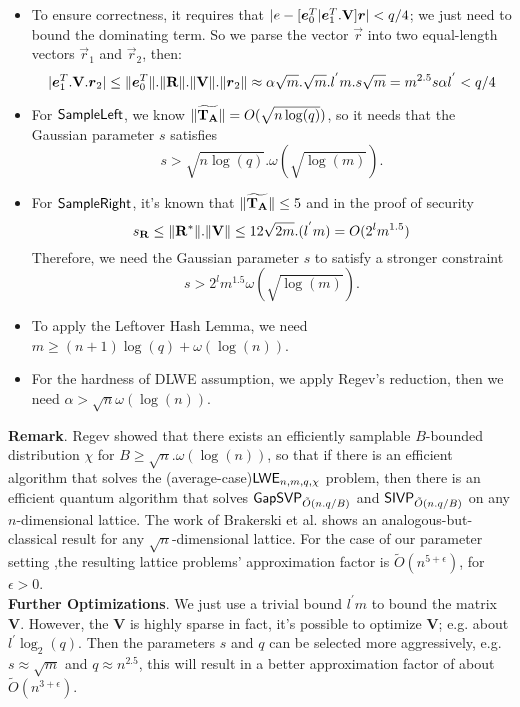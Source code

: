\begin{itemize}
 \item To ensure correctness, it requires that $|e-[\boldsymbol{e}^{T}_{0}|\boldsymbol{e}^{T}_{1}.\mathbf{V}]\boldsymbol{r}|< q/4$; we just need to bound the dominating term. So we parse the  vector $\vec{r}$ into two equal-length vectors $\vec{r}_{1}$ and $\vec{r}_{2}$, then:
 \begin{equation}
       |\boldsymbol{e}^{T}_{1}.\mathbf{V}.\boldsymbol{r}_{2}|\leq \| \boldsymbol{e}^{T}_{0}\|.\| \mathbf{R}\|.\| \mathbf{V}\|.\| \boldsymbol{r}_{2}\|\approx \alpha\sqrt{m}.\sqrt{m}.l^{'}m.s\sqrt{m}=m^{2.5}s\alpha l^{'}< q/4
\end{equation}
 \item For $\mathsf{SampleLeft}$, we know $\| \widetilde{\mathbf{T}_{\mathbf{A}}}\|=O(\sqrt{n\log(q)})$, so it needs that the Gaussian parameter $s$ satisfies
 \begin{equation}
 s>\sqrt{n\log(q)}.\omega(\sqrt{\log(m)}).
 \end{equation}
 \item For $\mathsf{SampleRight}$, it's known that $\| \widetilde{\mathbf{T}_{\mathbf{A}}}\|\leq 5$ and in the proof of security
 \begin{equation}
 s_{\mathbf{R}}\leq \| \mathbf{R}^{*}\|.\| \mathbf{V}\|\leq 12\sqrt{2m}.(l^{'}m)=O(2^{l}m^{1.5})
 \end{equation}
 Therefore, we need the Gaussian parameter $s$ to satisfy a stronger constraint
 \begin{equation}
 s>2^{l}m^{1.5}\omega(\sqrt{\log(m)}).
 \end{equation}
 \item To apply the Leftover Hash Lemma, we need $m\geq (n+1)\log(q)+\omega(\log(n))$.
 \item For the hardness of DLWE assumption, we apply Regev's reduction, then we need $\alpha >\sqrt{n}\omega(\log(n))$.
\end{itemize}
\textbf{Remark}. Regev \cite{STOC:Regev05} showed that there exists an efficiently samplable $B$-bounded distribution $\chi$ for $B\geq \sqrt{n}.\omega(\log(n))$, so that if there is an efficient algorithm that solves the (average-case)$\mathsf{LWE}_{n,m,q,\chi}$ problem, then there is an efficient quantum algorithm that solves $\mathsf{GapSVP}_{\tilde{O}(n.q/B)}$ and $\mathsf{SIVP}_{\tilde{O}(n.q/B)}$ on any $n$-dimensional lattice. The work of Brakerski et al.\cite{STOC:BLPRS13} shows an analogous-but-classical result for any $\sqrt{n}$-dimensional lattice. For the case of our parameter setting ,the resulting lattice problems' approximation factor is $\widetilde{O}(n^{5+\epsilon})$, for $\epsilon>0$.\\[0.6cm]
\textbf{Further Optimizations}. We just use a trivial bound $l^{'}m$ to bound the matrix $\textbf{V}$. However, the $\textbf{V}$ is highly sparse in fact, it's possible to optimize $\textbf{V}$; e.g. about $l^{'}\log_{2}(q)$. Then the parameters $s$ and $q$ can be selected more aggressively, e.g. $s\approx \sqrt{m}$ and $q\approx n^{2.5}$, this will result in a better approximation factor of about $\widetilde{O}(n^{3+\epsilon})$.\

